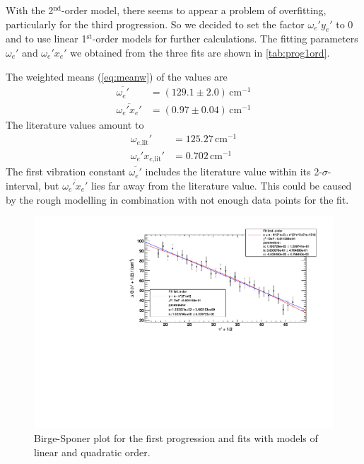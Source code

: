 With the 2$^\text{nd}$-order model, there seems to appear a problem of overfitting,
particularly for the third progression.
So we decided to set the factor $\omega_e' y_e'$ to 0 and to use linear 1$^\text{st}$-order models
for further calculations.
The fitting parameters $\omega_e'$ and $\omega_e' x_e'$ we obtained from the three fits
are shown in \autoref{tab:prog1ord}.

The weighted means (\autoref{eq:meanw}) of the values are
\begin{equation}
\label{eq:exstatevibconsts}
\begin{split}
    \overline{\omega_e'}		&   = (129.1 \pm 2.0)\,\text{cm}^{-1}\\
    \overline{\omega_e' x_e'} 	&	= (0.97 \pm 0.04)\,\text{cm}^{-1}
  \end{split}
\end{equation}
The literature values \cite{steinfeld} amount to
\begin{equation}
\begin{split}
    \omega_{e\text{,lit}}'			&   = 125.27\,\text{cm}^{-1}\\
    \omega_e' x_{e\text{,lit}}' 	&	= 0.702\,\text{cm}^{-1}
  \end{split}
\end{equation}
The first vibration constant $\overline{\omega_e'}$ includes the literature value within its 2-$\sigma$-interval, but
$\overline{\omega_e' x_e'}$ lies far away from the literature value. This could be caused by the rough
modelling in combination with not enough data points for the fit.



\begin{figure}[H]
\begin{center}
  \includegraphics[width=\textwidth]{../img/prog1_birgesponer.pdf}
  \caption[---]{Birge-Sponer plot for the first progression and fits with models of linear and quadratic order.}
  \label{img:prog1}
\end{center}
\end{figure}


